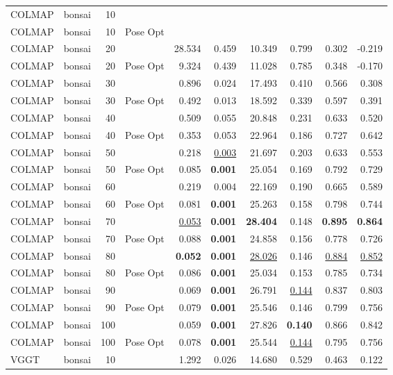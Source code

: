\begin{table}[H]
\begin{tabular}{llrlrrrrrr}
\midrule
COLMAP & bonsai & 10 &  &  &  &  &  &  &  \\
COLMAP & bonsai & 10 & Pose Opt &  &  &  &  &  &  \\
COLMAP & bonsai & 20 &  & 28.534 & 0.459 & 10.349 & 0.799 & 0.302 & -0.219 \\
COLMAP & bonsai & 20 & Pose Opt & 9.324 & 0.439 & 11.028 & 0.785 & 0.348 & -0.170 \\
COLMAP & bonsai & 30 &  & 0.896 & 0.024 & 17.493 & 0.410 & 0.566 & 0.308 \\
COLMAP & bonsai & 30 & Pose Opt & 0.492 & 0.013 & 18.592 & 0.339 & 0.597 & 0.391 \\
COLMAP & bonsai & 40 &  & 0.509 & 0.055 & 20.848 & 0.231 & 0.633 & 0.520 \\
COLMAP & bonsai & 40 & Pose Opt & 0.353 & 0.053 & 22.964 & 0.186 & 0.727 & 0.642 \\
COLMAP & bonsai & 50 &  & 0.218 & \underline{0.003} & 21.697 & 0.203 & 0.633 & 0.553 \\
COLMAP & bonsai & 50 & Pose Opt & 0.085 & \textbf{0.001} & 25.054 & 0.169 & 0.792 & 0.729 \\
COLMAP & bonsai & 60 &  & 0.219 & 0.004 & 22.169 & 0.190 & 0.665 & 0.589 \\
COLMAP & bonsai & 60 & Pose Opt & 0.081 & \textbf{0.001} & 25.263 & 0.158 & 0.798 & 0.744 \\
COLMAP & bonsai & 70 &  & \underline{0.053} & \textbf{0.001} & \textbf{28.404} & 0.148 & \textbf{0.895} & \textbf{0.864} \\
COLMAP & bonsai & 70 & Pose Opt & 0.088 & \textbf{0.001} & 24.858 & 0.156 & 0.778 & 0.726 \\
COLMAP & bonsai & 80 &  & \textbf{0.052} & \textbf{0.001} & \underline{28.026} & 0.146 & \underline{0.884} & \underline{0.852} \\
COLMAP & bonsai & 80 & Pose Opt & 0.086 & \textbf{0.001} & 25.034 & 0.153 & 0.785 & 0.734 \\
COLMAP & bonsai & 90 &  & 0.069 & \textbf{0.001} & 26.791 & \underline{0.144} & 0.837 & 0.803 \\
COLMAP & bonsai & 90 & Pose Opt & 0.079 & \textbf{0.001} & 25.546 & 0.146 & 0.799 & 0.756 \\
COLMAP & bonsai & 100 &  & 0.059 & \textbf{0.001} & 27.826 & \textbf{0.140} & 0.866 & 0.842 \\
COLMAP & bonsai & 100 & Pose Opt & 0.078 & \textbf{0.001} & 25.544 & \underline{0.144} & 0.795 & 0.756 \\
VGGT & bonsai & 10 &  & 1.292 & 0.026 & 14.680 & 0.529 & 0.463 & 0.122 \\

\end{tabular}
\end{table}
